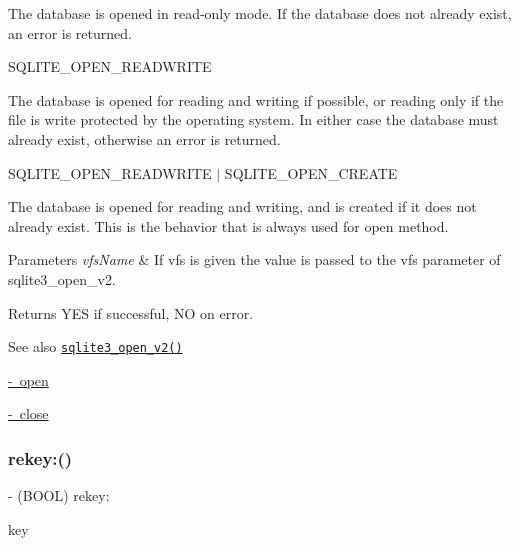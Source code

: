 The database is opened in read-\/only mode. If the database does not already exist, an error is returned.

{\ttfamily S\+Q\+L\+I\+T\+E\+\_\+\+O\+P\+E\+N\+\_\+\+R\+E\+A\+D\+W\+R\+I\+TE}

The database is opened for reading and writing if possible, or reading only if the file is write protected by the operating system. In either case the database must already exist, otherwise an error is returned.

{\ttfamily S\+Q\+L\+I\+T\+E\+\_\+\+O\+P\+E\+N\+\_\+\+R\+E\+A\+D\+W\+R\+I\+TE $\vert$ S\+Q\+L\+I\+T\+E\+\_\+\+O\+P\+E\+N\+\_\+\+C\+R\+E\+A\+TE}

The database is opened for reading and writing, and is created if it does not already exist. This is the behavior that is always used for {\ttfamily open} method.


\begin{DoxyParams}{Parameters}
{\em vfs\+Name} & If vfs is given the value is passed to the vfs parameter of sqlite3\+\_\+open\+\_\+v2.\\
\hline
\end{DoxyParams}
\begin{DoxyReturn}{Returns}
{\ttfamily Y\+ES} if successful, {\ttfamily NO} on error.
\end{DoxyReturn}
\begin{DoxySeeAlso}{See also}
\href{http://sqlite.org/c3ref/open.html}{\tt sqlite3\+\_\+open\+\_\+v2()} 

\mbox{\hyperlink{interface_o_p_t_l_y_f_m_d_b_database_afc3b896f0808f555b09064bb6d514f93}{-\/ open}} 

\mbox{\hyperlink{interface_o_p_t_l_y_f_m_d_b_database_a6979a72ddb72bf8187a06607943bee98}{-\/ close}} 
\end{DoxySeeAlso}
\mbox{\label{interface_o_p_t_l_y_f_m_d_b_database_af64a2ede2ac7642bada99f4ba1d905f2}} 
\subsubsection{\texorpdfstring{rekey\+:()}{rekey:()}}
{\footnotesize\ttfamily -\/ (B\+O\+OL) rekey\+: \begin{DoxyParamCaption}\item[{(N\+S\+String$\ast$)}]{key }\end{DoxyParamCaption}}

